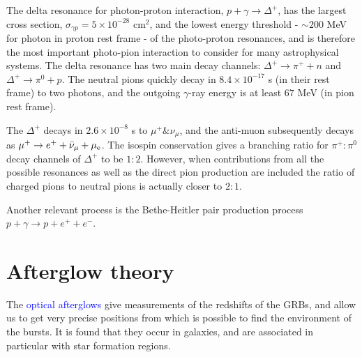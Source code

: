 \documentclass[12pt,a4paper]{article}
\newcounter{theo}[section]\setcounter{theo}{0}
\begin{document}
The delta resonance for photon-proton interaction, $p + \gamma \rightarrow \Delta^+$, has the largest cross section, $\sigma_{\gamma p} = 5\times 10^{-28}$ cm$^2$, and the lowest energy threshold - $\sim 200$ MeV for photon in proton rest frame - of the photo-proton resonances, and is therefore the most important photo-pion interaction to consider for many astrophysical systems. The delta resonance has two main decay channels: $\Delta^+ \rightarrow \pi^+ + n$ and $\Delta^+ \rightarrow \pi^0 + p$. The neutral pions quickly decay in $8.4 \times 10^{-17}$ s (in their rest frame) to two photons, and the outgoing $\gamma$-ray energy is at least $67$ MeV (in pion rest frame).

The $\Delta^+$ decays in $2.6 \times 10^{-8}$ s to $\mu^+ \& \nu_{\mu}$, and the anti-muon subsequently decays as $\mu^+ \rightarrow e^+ + \bar{\nu}_\mu + \mu_{\rm e}$. The isospin conservation gives a branching ratio for $\pi^+ : \pi^0$ decay channels of $\Delta^+$ to be $1 : 2$. However, when contributions from all the possible resonances as well as the direct pion production are included the ratio of charged pions to neutral pions is actually closer to $2 : 1$. 

Another relevant process is the Bethe-Heitler pair production process $p + \gamma \rightarrow p + e^+ + e^-$.
































\section{Afterglow theory}

\cite{courvoisier2012high} The \textcolor{blue}{optical afterglows} give measurements of the redshifts of the GRBs, and allow us to get very precise positions from which is possible to find the environment of the bursts. It is found that they occur in galaxies, and are associated in particular with star formation regions.
\end{document}
